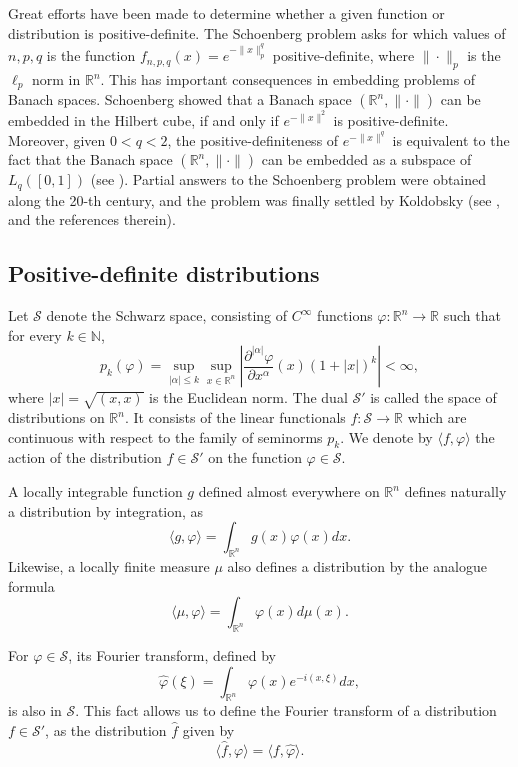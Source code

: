 \documentclass{amsart}
\def \R {\mathbb R}
\def \N {\mathbb N}
\def \S {\mathcal S}
\begin{document}
Great efforts have been made to determine whether a given function or distribution is positive-definite.
The Schoenberg problem asks for which values of $n,p,q$ is the function $f_{n,p,q}(x) = e^{-\|x\|_p^q}$ positive-definite, where $\|\cdot\|_p$ is the $\ell_p$ norm in $\R^n$.
This has important consequences in embedding problems of Banach spaces.
Schoenberg showed that a Banach space $(\R^n, \|\cdot\|)$ can be embedded in the Hilbert cube, if and only if $e^{-\|x\|^2}$ is positive-definite.
Moreover, given $0< q < 2$, the positive-definiteness of $e^{-\|x\|^q}$ is equivalent to the fact that the Banach space $(\R^n, \|\cdot\|)$ can be embedded as a subspace of $L_q([0,1])$ (see \cite[Theorem 6.6]{koldobsky2005fourier}).
Partial answers to the Schoenberg problem were obtained along the 20-th century, and the problem was finally settled by Koldobsky (see \cite{koldobsky1991schoenbergoriginal}, \cite{koldobsky1992schoenberg} and the references therein).

\subsection{Positive-definite distributions}
Let $\S$ denote the Schwarz space, consisting of $C^\infty$ functions $\varphi:\R^n \to \R$ such that for every $k \in \N$,
\[p_k(\varphi) = \sup_{|\alpha| \leq k} \sup_{x\in\R^n} \left| \frac{\partial^{|\alpha|} \varphi}{\partial x^\alpha} (x) (1+|x|)^k \right| < \infty,\]
where $|x| = \sqrt{(x, x)}$ is the Euclidean norm.
The dual $\S'$ is called the space of distributions on $\R^n$.
It consists of the linear functionals $f:\S \to \R$ which are continuous with respect to the family of seminorms $p_k$.
We denote by $\langle f, \varphi \rangle$ the action of the distribution $f \in \S'$ on the function $\varphi \in \S$.

A locally integrable function $g$ defined almost everywhere on $\R^n$ defines naturally a distribution by integration, as
\[\langle g, \varphi \rangle = \int_{\R^n} g(x) \varphi(x) dx.\]
Likewise, a locally finite measure $\mu$ also defines a distribution by the analogue formula
\[\langle \mu, \varphi \rangle = \int_{\R^n} \varphi(x) d \mu(x).\]

For $\varphi \in \S$, its Fourier transform, defined by
\[\hat \varphi(\xi) = \int_{\R^n} \varphi(x) e^{-i (x, \xi) } d x,\]
is also in $\S$. This fact allows us to define the Fourier transform of a distribution $f \in \S'$, as the distribution $\hat f$ given by
\[\langle \hat f, \varphi \rangle = \langle f, \hat \varphi \rangle.\]
\end{document}
